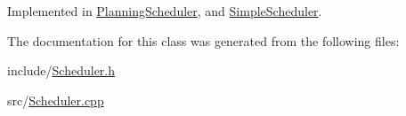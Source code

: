 Implemented in \hyperlink{class_planning_scheduler_a30e0bb81405e162e596e428cb2a6c1e3}{Planning\+Scheduler}, and \hyperlink{class_simple_scheduler_a76990bffc6cf70197e96d41535ebf260}{Simple\+Scheduler}.



The documentation for this class was generated from the following files\+:\begin{DoxyCompactItemize}
\item 
include/\hyperlink{_scheduler_8h}{Scheduler.\+h}\item 
src/\hyperlink{_scheduler_8cpp}{Scheduler.\+cpp}\end{DoxyCompactItemize}
